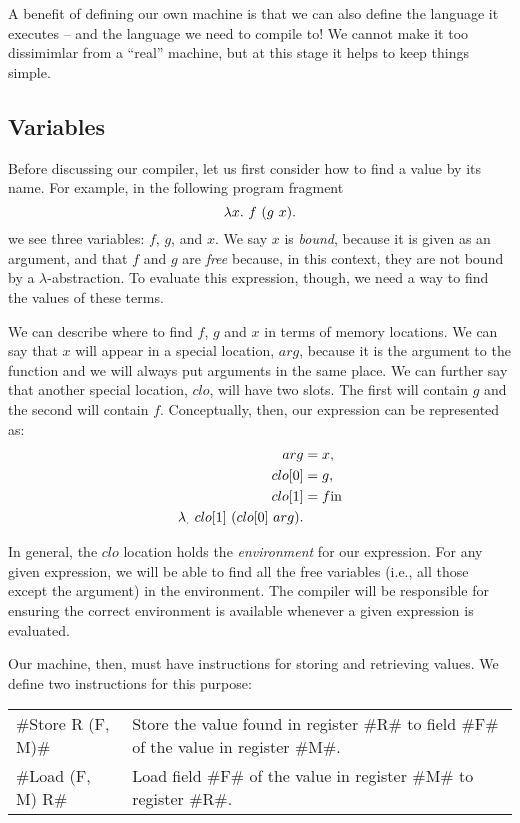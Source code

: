 \documentclass[12pt]{report}
\begin{document}
A benefit of defining our own machine is that we can also define the
language it executes -- and the language we need to compile to! We
cannot make it too dissimimlar from a ``real'' machine, but at this
stage it helps to keep things simple. 

\subsection{Variables}

Before discussing our compiler, let us first consider how to find
a value by its name. For example, in the following program fragment
\begin{equation}
  \lambda x.\ f\ (g\ x).
  \label{eq_lang1}
\end{equation}
we see three variables: $f$, $g$, and $x$. We say $x$ is \emph{bound},
because it is given as an argument, and that $f$ and $g$ are
\emph{free} because, in this context, they are not bound by a
$\lambda$-abstraction. To evaluate this expression, though, we need
a way to find the values of these terms.  

We can describe where to find $f$, $g$ and $x$ in terms of memory
locations. We can say that $x$ will appear in a special location,
$arg$, because it is the argument to the function and we will always
put arguments in the same place. We can further say that another
special location, $clo$, will have two
slots. The first will contain $g$ and the second will contain
$f$. Conceptually, then, our expression can be represented as:
\begin{equation}
  \begin{split}
    arg &= x, \\
    clo[0] &= g, \\
    clo[1] &= f \text{in} \\
    \lambda_.\ clo[1]\ (clo[0]\ arg).
  \end{split}
\end{equation}

In general, the $clo$ location holds the \emph{environment} for our
expression. For any given expression, we will be able to find all the
free variables (i.e., all those except the argument) in the
environment. The compiler will be responsible for ensuring the correct
environment is available whenever a given expression is evaluated.

Our machine, then, must have instructions for storing and retrieving
values. We define two instructions for this purpose:
\begin{center}
  \begin{tabular}{ll}
    #Store R (F, M)# & Store the value found in register #R# to field %
    #F# of the value in register #M#. \\
    #Load (F, M) R# & Load field #F# of the value in register #M# to register #R#. \\
  \end{tabular}
\end{center}
\end{document}
